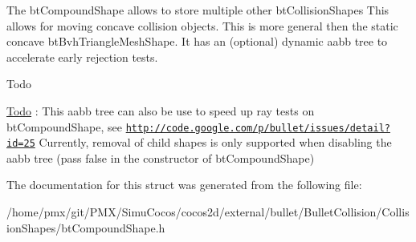 The bt\+Compound\+Shape allows to store multiple other bt\+Collision\+Shapes This allows for moving concave collision objects. This is more general then the static concave bt\+Bvh\+Triangle\+Mesh\+Shape. It has an (optional) dynamic aabb tree to accelerate early rejection tests. \begin{DoxyRefDesc}{Todo}
\item[\hyperlink{todo__todo000050}{Todo}]\+: This aabb tree can also be use to speed up ray tests on bt\+Compound\+Shape, see \href{http://code.google.com/p/bullet/issues/detail?id=25}{\tt http\+://code.\+google.\+com/p/bullet/issues/detail?id=25} Currently, removal of child shapes is only supported when disabling the aabb tree (pass \textquotesingle{}false\textquotesingle{} in the constructor of bt\+Compound\+Shape) \end{DoxyRefDesc}


The documentation for this struct was generated from the following file\+:\begin{DoxyCompactItemize}
\item 
/home/pmx/git/\+P\+M\+X/\+Simu\+Cocos/cocos2d/external/bullet/\+Bullet\+Collision/\+Collision\+Shapes/bt\+Compound\+Shape.\+h\end{DoxyCompactItemize}
